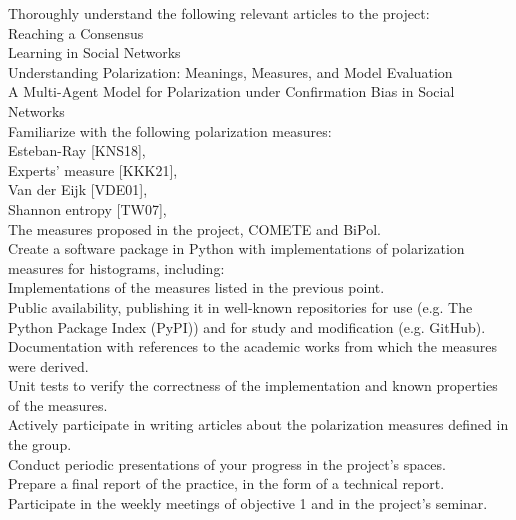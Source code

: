 \documentclass[preview]{standalone}
\begin{document}
Thoroughly understand the following relevant articles to the project:\\Reaching a Consensus\\Learning in Social Networks\\Understanding Polarization: Meanings, Measures, and Model Evaluation\\A Multi-Agent Model for Polarization under Confirmation Bias in Social Networks\\Familiarize with the following polarization measures:\\Esteban-Ray [KNS18],\\Experts' measure [KKK21],\\Van der Eijk [VDE01],\\Shannon entropy [TW07],\\The measures proposed in the project, COMETE and BiPol.\\Create a software package in Python with implementations of polarization measures for histograms, including:\\Implementations of the measures listed in the previous point.\\Public availability, publishing it in well-known repositories for use (e.g. The Python Package Index (PyPI)) and for study and modification (e.g. GitHub).\\Documentation with references to the academic works from which the measures were derived.\\Unit tests to verify the correctness of the implementation and known properties of the measures.\\Actively participate in writing articles about the polarization measures defined in the group.\\Conduct periodic presentations of your progress in the project's spaces.\\Prepare a final report of the practice, in the form of a technical report.\\Participate in the weekly meetings of objective 1 and in the project's seminar.\\
\end{document}
